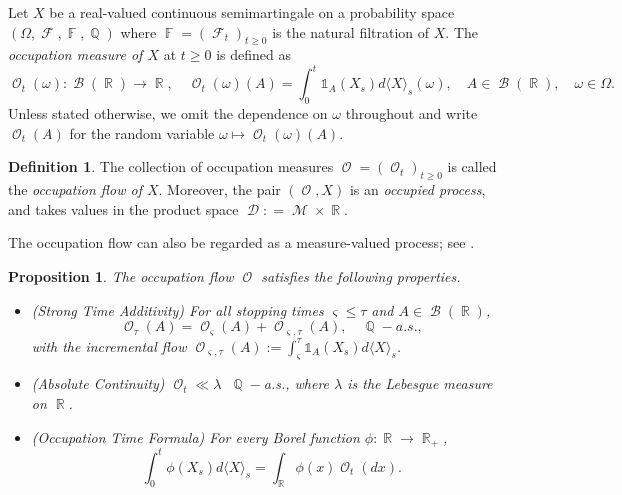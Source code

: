 \documentclass[11pt]{article}
\theoremstyle{plain}
\newtheorem{proposition}{Proposition}
\theoremstyle{definition}
\newtheorem{definition}{Definition}
\DeclareMathOperator{\F}{\mathbb{F}}
\DeclareMathOperator{\Q}{\mathbb{Q}}
\DeclareMathOperator{\R}{\mathbb{R}}
\DeclareMathOperator{\calB}{\mathcal{B}}
\DeclareMathOperator{\calD}{\mathcal{D}}
\DeclareMathOperator{\calF}{\mathcal{F}}
\DeclareMathOperator{\calM}{\mathcal{M}}
\DeclareMathOperator{\calO}{\mathcal{O}}
\begin{document}
Let $X$ be a real-valued continuous semimartingale 
on a probability space $(\Omega,\calF,\F,\Q)$ where $\F = (\calF_t)_{t\ge 0}$ is the natural filtration of $X$. The  \textit{occupation measure  of $X$} at $t\ge 0$ is defined as  
\begin{equation}\label{eq:occMeasure}
    \calO_t(\omega): \calB(\R) \to \R, \quad  \calO_t(\omega)(A) =\int_0^t\mathds{1}_A(X_s
)d\langle X \rangle_s(\omega), \quad A \in \calB(\R), \quad \omega \in \Omega. 
 \end{equation}
Unless stated otherwise,  we  omit the dependence on $\omega$ throughout and write $\calO_t(A)$ for the random variable $\omega \mapsto \calO_t(\omega)(A)$. 
\begin{definition}
The collection of  occupation measures $\calO = (\calO_t)_{t\ge 0}$  is called the \textit{occupation flow of $X$}. Moreover, the pair $(\calO,X)$ is  an \textit{occupied process}, and takes values in the product space $\calD  : =  \calM \times \R$. 
\end{definition}
The  occupation flow can also be regarded as a measure-valued process; see  \cite{Dawson75,Dawson93,FlemingViot}. 
\begin{proposition}\label{prop:OccProperties} 
The occupation flow $\calO$ satisfies the following properties. 
    \begin{itemize}
        \item[\textnormal{I.}] \textnormal{(Strong Time Additivity)} 
        For all stopping times $\varsigma \le \tau$ and $A \in \calB(\R)$,  
\begin{equation}\label{eq:additive}
    \calO_{\tau}(A) = \calO_{\varsigma}(A) + \calO_{\varsigma,\tau}(A), \quad \Q-a.s., 
\end{equation}
with the incremental flow
$\calO_{\varsigma,\tau}(A) := \int_\varsigma^\tau \mathds{1}_{A}(X_s)d\langle X \rangle_s$. 

        \item[\textnormal{II.}] \textnormal{(Absolute Continuity)} $\calO_t \ll \lambda$ $ \ \Q-$a.s., where $\lambda$ is the Lebesgue measure on $\R$. 
             \item[\textnormal{III.}] \textnormal{(Occupation Time Formula)} For every Borel function $\phi:\R\to \R_{+}$, 
\begin{equation}\label{eq:OTF}
    \int_0^t \phi(X_s)d\langle X \rangle_s = \int_{\R} \phi(x)\calO_t(dx).  
\end{equation}
             
    \end{itemize}
\end{proposition}
\end{document}
